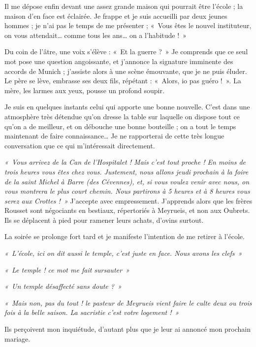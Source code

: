 
Il me dépose enfin devant une assez grande maison qui pourrait être l'école ; la maison d'en face est éclairée. Je frappe et je suis accueilli par deux jeunes hommes ; je n'ai pas le temps de me présenter ; «~Vous êtes le nouvel instituteur, on vous attendait… comme tous les ans… on a l'habitude !~»

Du coin de l'âtre, une voix s'élève : «~Et la guerre ?~» Je comprends que ce seul mot
pose une question angoissante, et j'annonce la signature imminente des accords de
Munich ; j'assiste alors à une scène émouvante, que je ne puis éluder. Le père se lève,
embrasse ses deux fils, répétant : «~Alors, io pas guéro !~». La mère, les larmes aux
yeux, pousse un profond soupir.

Je suis en quelques instants celui qui apporte une bonne nouvelle. C'est dans une
atmosphère très détendue qu'on dresse la table sur laquelle on dispose tout ce qu'on a
de meilleur, et on débouche une bonne bouteille ; on a tout le temps maintenant de
faire connaissance… Je ne rapporterai de cette très longue conversation que ce qui
m'intéressait directement.

\textit{«~Vous arrivez de la Can de l'Hospitalet ! Mais c'est tout proche ! En moins de trois
heures vous êtes chez vous. Justement, nous allons jeudi prochain à la foire de la saint
Michel à Barre (des Cévennes), et, si vous voulez venir avec nous, on vous montrera
le plus court chemin. Nous partirons à 5 heures et à 8 heures vous serez aux Crottes !~»}
J'accepte avec empressement. J'apprends alors que les frères Rousset sont négociants
en bestiaux, répertoriés à Meyrueis, et non aux Oubrets. Ils se déplacent à pied pour
ramener leurs achats, d'ovins surtout.

La soirée se prolonge fort tard et je manifeste l'intention de me retirer à l'école.

\textit{«~L'école, ici on dit aussi le temple, c'est juste en face. Nous avons les clefs~»}

\textit{«~Le temple ! ce mot me fait sursauter~»}

\textit{«~Un temple désaffecté sans doute ?~»}

\textit{«~Mais non, pas du tout ! le pasteur de Meyrueis vient faire le culte deux ou trois
fois à la belle saison. La sacristie c'est votre logement !~»}

Ils perçoivent mon inquiétude, d'autant plus que je leur ai annoncé mon prochain mariage.

